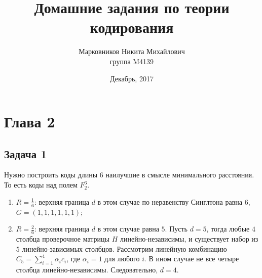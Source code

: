 \documentclass{article}
\title{Домашние задания по теории кодирования}
\author{Марковников Никита Михайлович \\ группа M4139}
\date{Декабрь, 2017}
\begin{document}
\maketitle

\section{Глава 2}
%
\subsection{Задача 1}
Нужно построить коды длины $6$ наилучшие в смысле минимального расстояния. То есть коды над полем $F_{2}^{6}$.
\begin{enumerate}
    \item $R=\frac{1}{6}$: верхняя граница $d$ в этом случае по неравенству Синглтона равна $6$, $G = (1, 1, 1, 1, 1, 1)$;
    \item $R=\frac{2}{6}$: верхняя граница $d$ в этом случае равна $5$. Пусть $d =5$, тогда любые $4$ столбца проверочное матрицы $H$ линейно-независимы, и существует набор из $5$ линейно-зависимых столбцов. Рассмотрим линейную комбинацию $C_{5}=\sum_{i=1}^{4}\alpha_{i}c_{i}$, где $\alpha_{i}=1$ для любого $i$. В ином случае не все четыре столбца линейно-независимы. Следовательно, $d=4$.
    

\end{enumerate}
\end{document}
